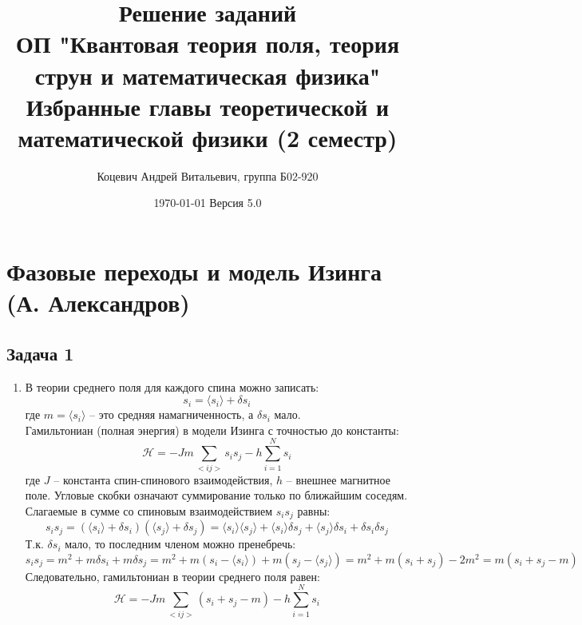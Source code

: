 \documentclass[12pt]{article}
\title{Решение заданий\\ ОП "Квантовая теория поля, теория струн и математическая физика"\\[2cm]
Избранные главы теоретической и математической физики (2 семестр)}
\author{Коцевич Андрей Витальевич, группа Б02-920}
\date{\today\; Версия 5.0}
\begin{document}
\maketitle
\newpage
\newpage
\tableofcontents{}
\newpage
\maketitle

\section{Фазовые переходы и модель Изинга (А. Александров)}
\subsection{Задача 1}
\begin{enumerate}
    \item В теории среднего поля для каждого спина можно записать:
    \begin{equation}
        s_i=\langle s_i\rangle+\delta s_i
    \end{equation}
    где $m=\langle s_i\rangle$ -- это средняя намагниченность, а $\delta s_i$ мало.\\
    Гамильтониан (полная энергия) в модели Изинга с точностью до константы:
    \begin{equation}
        \mathcal{H}=-Jm\sum\limits_{<ij>}s_is_j-h\sum\limits_{i=1}^Ns_i
    \end{equation}
    где $J$ -- константа спин-спинового взаимодействия, $h$ -- внешнее магнитное поле. Угловые скобки означают суммирование только по ближайшим соседям.
    Слагаемые в сумме со спиновым взаимодействием $s_is_j$ равны:
    \begin{equation}
        s_is_j=(\langle s_i\rangle+\delta s_i)(\langle s_j\rangle+\delta s_j)=\langle s_i\rangle\langle s_j\rangle+\langle s_i\rangle\delta s_j+\langle s_j\rangle\delta s_i+\delta s_i\delta s_j
    \end{equation}
    Т.к. $\delta s_i$ мало, то последним членом можно пренебречь:
    \begin{equation*}
        s_is_j=m^2+m\delta s_i+m\delta s_j=m^2+m(s_i-\langle s_i\rangle)+m(s_j-\langle s_j\rangle)=m^2+m(s_i+s_j)-2m^2=m(s_i+s_j-m)
    \end{equation*}
    Следовательно, гамильтониан в теории среднего поля равен:
    \begin{equation}
        \mathcal{H}=-Jm\sum\limits_{<ij>}(s_i+s_j-m)-h\sum\limits_{i=1}^Ns_i

\end{equation}
\end{enumerate}
\end{document}
